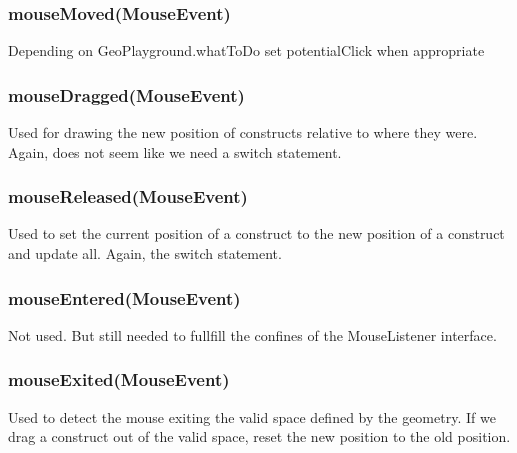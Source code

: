 \documentclass[a4paper,10pt]{report}
\begin{document}
\subsubsection{mouseMoved(MouseEvent)} Depending on GeoPlayground.whatToDo set potentialClick when appropriate
\subsubsection{mouseDragged(MouseEvent)} Used for drawing the new position of constructs relative to where they were.  Again, does not seem like we need a switch statement.
\subsubsection{mouseReleased(MouseEvent)} Used to set the current position of a construct to the new position of a construct and update all.  Again, the switch statement.
\subsubsection{mouseEntered(MouseEvent)} Not used. But still needed to fullfill the confines of the MouseListener interface.
\subsubsection{mouseExited(MouseEvent)} Used to detect the mouse exiting the valid space defined by the geometry.  If we drag a construct out of the valid space, reset the new position to the old position.
\end{document}

